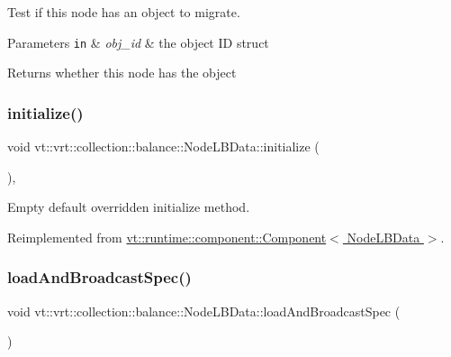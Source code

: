 Test if this node has an object to migrate. 


\begin{DoxyParams}[1]{Parameters}
\mbox{\tt in}  & {\em obj\+\_\+id} & the object ID struct\\
\hline
\end{DoxyParams}
\begin{DoxyReturn}{Returns}
whether this node has the object 
\end{DoxyReturn}
\mbox{\label{structvt_1_1vrt_1_1collection_1_1balance_1_1_node_l_b_data_aa489e1252abac8237d30bb0110ad36f9}} 
\subsubsection{\texorpdfstring{initialize()}{initialize()}}
{\footnotesize\ttfamily void vt\+::vrt\+::collection\+::balance\+::\+Node\+L\+B\+Data\+::initialize (\begin{DoxyParamCaption}{ }\end{DoxyParamCaption})\hspace{0.3cm}{\ttfamily [override]}, {\ttfamily [virtual]}}



Empty default overridden initialize method. 



Reimplemented from \hyperlink{structvt_1_1runtime_1_1component_1_1_component_a7f07384d294e59796add9ce6be2d6410}{vt\+::runtime\+::component\+::\+Component$<$ Node\+L\+B\+Data $>$}.

\mbox{\label{structvt_1_1vrt_1_1collection_1_1balance_1_1_node_l_b_data_ace5a540d8a81e8530ba38cb63580fbb9}} 
\subsubsection{\texorpdfstring{load\+And\+Broadcast\+Spec()}{loadAndBroadcastSpec()}}
{\footnotesize\ttfamily void vt\+::vrt\+::collection\+::balance\+::\+Node\+L\+B\+Data\+::load\+And\+Broadcast\+Spec (\begin{DoxyParamCaption}{ }\end{DoxyParamCaption})}



